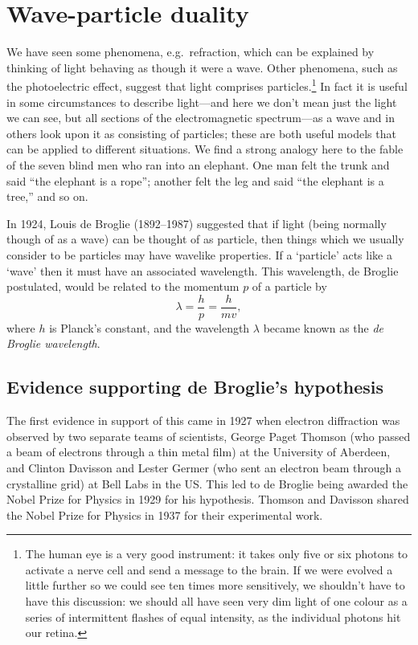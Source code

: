 
\section{Wave-particle duality}
We have seen some phenomena, e.g.\ refraction, which can be explained by thinking of light behaving as though it were a wave.  Other phenomena, such as the photoelectric effect, suggest that light comprises particles.\footnote{The human eye is a very good instrument: it takes only five or six photons to activate a nerve cell and send a message to the brain.  If we were evolved a little further so we could see ten times more sensitively, we shouldn't have to have this discussion: we should all have seen very dim light of one colour as a series of intermittent flashes of equal intensity, as the individual photons hit our retina.}  In fact it is useful in some circumstances to describe light---and here we don't mean just the light we can see, but all sections of the electromagnetic spectrum---as a wave and in others look upon it as consisting of particles; these are both useful models that can be applied to different situations.  We find a strong analogy here to the fable of the seven blind men who ran into an elephant.  One man felt the trunk and said ``the elephant is a rope''; another felt the leg and said ``the elephant is a tree,'' and so on.

In 1924, Louis de Broglie (1892--1987) suggested that if light (being normally though of as a wave) can be thought of as particle, then things which we usually consider to be particles may have wavelike properties.  If a `particle' acts like a `wave' then it must have an associated wavelength.  This wavelength, de Broglie postulated, would be related to the momentum $p$ of a particle by
\[\lambda=\frac{h}{p}=\frac{h}{mv},\]
where $h$ is Planck's constant, and the wavelength $\lambda$ became known as the \emph{de Broglie wavelength}.

\subsection{Evidence supporting de Broglie's hypothesis}
The first evidence in support of this came in 1927 when electron diffraction was observed by two separate teams of scientists, George Paget Thomson (who passed a beam of electrons through a thin metal film) at the University of Aberdeen, and Clinton Davisson and Lester Germer (who sent an electron beam through a crystalline grid) at Bell Labs in the US.  This led to de Broglie being awarded the Nobel Prize for Physics in 1929 for his hypothesis. Thomson and Davisson shared the Nobel Prize for Physics in 1937 for their experimental work.


